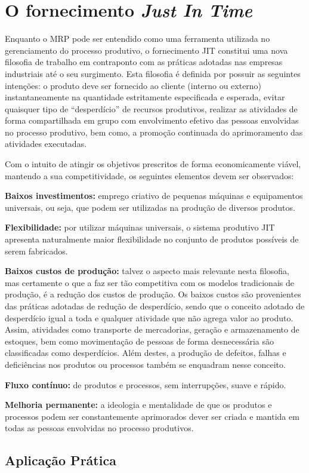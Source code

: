 \chapter{O fornecimento \textit{Just In Time}}
\label{chap:fornecimento_just_in_time}

Enquanto o \ac{MRP} pode ser entendido como uma ferramenta utilizada no gerenciamento do processo produtivo, o fornecimento \ac{JIT} constitui uma nova filosofia de trabalho em contraponto com as práticas adotadas nas empresas industriais até o seu surgimento. Esta filosofia é definida por possuir as seguintes intenções: o produto deve ser fornecido ao cliente (interno ou externo) instantaneamente na quantidade estritamente especificada e esperada, evitar quaisquer tipo de ``desperdício'' de recursos produtivos, realizar as atividades de forma compartilhada em grupo com envolvimento efetivo das pessoas envolvidas no processo produtivo, bem como, a promoção continuada do aprimoramento das atividades executadas.

Com o intuito de atingir os objetivos prescritos de forma economicamente viável, mantendo a sua competitividade, os seguintes elementos devem ser observados:

\textbf{Baixos investimentos:} emprego criativo de pequenas máquinas e equipamentos universais, ou seja, que podem ser utilizadas na produção de diversos produtos.

\textbf{Flexibilidade:} por utilizar máquinas universais, o sistema produtivo \ac{JIT} apresenta naturalmente maior flexibilidade no conjunto de produtos possíveis de serem fabricados.

\textbf{Baixos custos de produção:} talvez o aspecto mais relevante nesta filosofia, mas certamente o que a faz ser tão competitiva com os modelos tradicionais de produção, é a redução dos custos de produção. Os baixos custos são provenientes das práticas adotadas de redução de desperdício, sendo que o conceito adotado de desperdício igual a toda e qualquer atividade que não agrega valor ao produto. Assim, atividades como transporte de mercadorias, geração e armazenamento de estoques, bem como movimentação de pessoas de forma desnecessária são classificadas como desperdícios. Além destes, a produção de defeitos, falhas e deficiências nos produtos ou processos também se enquadram nesse conceito.

\textbf{Fluxo contínuo:} de produtos e processos, sem interrupções, suave e rápido.

\textbf{Melhoria permanente:} a ideologia e mentalidade de que os produtos e processos podem ser constantemente aprimorados dever ser criada e mantida em todas as pessoas envolvidas no processo produtivos.

\section{Aplicação Prática}
\label{sec:fonercimento_just_in_time_aplicacao}
